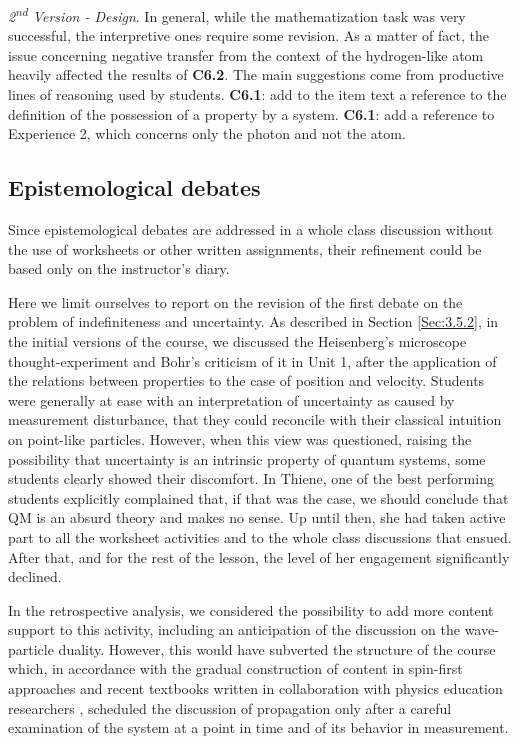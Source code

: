 \documentclass[twocolumn,secnumarabic,amssymb, nobibnotes, aps, prd, nofootinbib]{revtex4-2}
\begin{document}
\emph{2\textsuperscript{nd} Version - Design}. In general, while the mathematization task was very successful, the interpretive ones require some revision. As a matter of fact, the issue concerning negative transfer from the context of the hydrogen-like atom heavily affected the results of \textbf{C6.2}. The main suggestions come from productive lines of reasoning used by students. \textbf{C6.1}: add to the item text a reference to the definition of the possession of a property by a system. \textbf{C6.1}: add a reference to Experience 2, which concerns only the photon and not the atom.

\subsection{Epistemological debates} \label{Sec:5.5}
Since epistemological debates are addressed in a whole class discussion without the use of worksheets or other written assignments, their refinement could be based only on the instructor's diary.

Here we limit ourselves to report on the revision of the first debate on the problem of indefiniteness and uncertainty. As described in Section \ref{Sec:3.5.2}, in the initial versions of the course, we discussed the Heisenberg's microscope thought-experiment and Bohr's criticism of it in Unit 1, after the application of the relations between properties to the case of position and velocity. Students were generally at ease with an interpretation of uncertainty as caused by measurement disturbance, that they could reconcile with their classical intuition on point-like particles. However, when this view was questioned, raising the possibility that uncertainty is an intrinsic property of quantum systems, some students clearly showed their discomfort. In Thiene, one of the best performing students explicitly complained that, if that was the case, we should conclude that QM is an absurd theory and makes no sense. Up until then, she had taken active part to all the worksheet activities and to the whole class discussions that ensued. After that, and for the rest of the lesson, the level of her engagement significantly declined.

In the retrospective analysis, we considered the possibility to add more content support to this activity, including an anticipation of the discussion on the wave-particle duality. However, this would have subverted the structure of the course which, in accordance with the gradual construction of content in spin-first approaches \cite{Zuccarini2020} and recent textbooks written in collaboration with physics education researchers \cite{McIntyre2012}, scheduled the discussion of propagation only after a careful examination of the system at a point in time and of its behavior in measurement.
\end{document}
